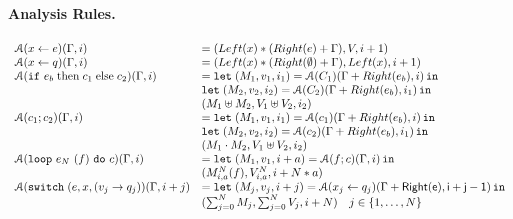 \documentclass[a4paper,11pt]{article}
\begin{document}
%
%
\paragraph{Analysis Rules.}
\[\begin{array}{ll}
    \mathcal{A}( \mathrel{ x \leftarrow e } )( \Gamma , i )  & =  ( Left(x) * ( Right(e) + \Gamma ), V, i+1 )\\
    \mathcal{A}( \mathrel{ x \leftarrow q })( \Gamma ,  i )  & = ( Left(x) * ( Right(\emptyset) + \Gamma) , Left(x) , i+1 )\\
    \mathcal{A}( \mathtt{if} ~ e_b \mbox{\;then\;} c_1 \mbox{\;else\;} c_2 )( \Gamma , i ) & =   \mathop{\mathtt{let}} \; (M_1, v_1, i_1) =  \mathcal{A}(C_1)(\Gamma +Right(e_b) , i)
    \mathop{ \mathtt{in}} \; \\
    &  \mathop{\mathtt{let}} \;  (M_2, v_2, i_2)= \mathcal{A}(C_2) (\Gamma +Right(e_b) ,i_1) \mathop{ \mathtt{in}} \; \\
    & (  M_1 \uplus M_2, V_1 \uplus V_2   , i_2 )
    \\
    \mathcal{A}( c_1 ; c_2 )( \Gamma ,  i )  & =  \mathop{\mathtt{let}} \;     (M_1, v_1, i_1) = 
    \mathcal{A}(c_1) (\Gamma  +Right(e_b) , i)
    \mathop{ \mathtt{in}} \; \\
    &  \mathop{\mathtt{let}} \;  (M_2, v_2, i_2) =                      \mathcal{A}(c_2)(\Gamma +Right(e_b) ,
      i_1) \mathop{ \mathtt{in}} \; \\ 
      & (  M_1 \cdot M_2, V_1 \uplus V_2   , i_2 )    \\
     \mathcal{A}( \mathtt{loop} ~ e_N ~ (f) ~ \mathtt{do} ~ c  )( \Gamma ,  i )  & =  \mathop{\mathtt{let}} \;     (M_1, v_1, i+a) = 
    \mathcal{A}(f;c ) (\Gamma , i)
    \mathop{ \mathtt{in}} \; \\
    & ( M_{i,a}^N(f), V_{i, a}^N , i + N*a ) \\
 \mathcal{A}( \mathtt{switch}\;(e, x,(v_j \rightarrow q_j )  )( \Gamma ,  i+j )  & =  \mathop{\mathtt{let}} \;     (M_j, v_j, i+j) = 
    \mathcal{A}(x_j \leftarrow q_j ) (\Gamma + \sf{Right}(e), i+j-1)     
   \mathop{ \mathtt{in}} \\
   & ( \sum_{j=0}^{N} M_j, \sum_{j=0}^{N} V_j, i + N ) \quad j \in \{1, \dots, N\}  \\
    \end{array}
\]
%
%
\end{document}
